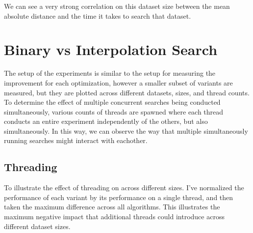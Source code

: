 \documentclass{article}
\begin{document}
We can see a very strong correlation on this dataset size between the mean absolute distance and the time it takes to search that dataset.

\begin{figure}
\end{figure}


\section{Binary vs Interpolation Search}
The setup of the experiments is similar to the setup for measuring the improvement for each optimization, however a smaller subset of variants are measured, but they are plotted across different datasets, sizes, and thread counts. To determine the effect of multiple concurrent searches being conducted simultaneously, various counts of threads are spawned where each thread conducts an entire experiment independently of the others, but also simultaneously. In this way, we can observe the way that multiple simultaneously running searches might interact with eachother.

\subsection{Threading}
To illustrate the effect of threading on across different sizes. I've normalized the performance of each variant by its performance on a single thread, and then taken the maximum difference across all algorithms. This illustrates the maximum negative impact that additional threads could introduce across different dataset sizes.

\begin{figure}
\end{figure}
\end{document}
